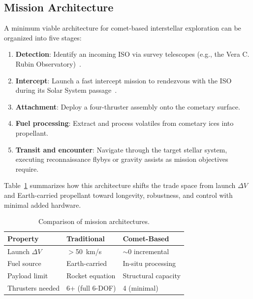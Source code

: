 \documentclass{article}
\begin{document}
\subsection{Mission Architecture}
\label{sec:mission_arch}

A minimum viable architecture for comet-based interstellar exploration can be organized into five stages:

\begin{enumerate}
    \item \textbf{Detection}: Identify an incoming ISO via survey telescopes (e.g., the Vera C. Rubin Observatory)~\cite{engelhardt2017population}.
    
    \item \textbf{Intercept}: Launch a fast intercept mission to rendezvous with the ISO during its Solar System passage~\cite{landau2023iso,loeb2025intercepting}.
    
    \item \textbf{Attachment}: Deploy a four-thruster assembly onto the cometary surface.
    
    \item \textbf{Fuel processing}: Extract and process volatiles from cometary ices into propellant.
    
    \item \textbf{Transit and encounter}: Navigate through the target stellar system, executing reconnaissance flybys or gravity assists as mission objectives require.
\end{enumerate}

Table~\ref{tab:architecture} summarizes how this architecture shifts the trade space from launch $\Delta V$ and Earth-carried propellant toward longevity, robustness, and control with minimal added hardware.

\begin{table}[h!]
\caption{Comparison of mission architectures.}
\label{tab:architecture}
\centering
\small
\setlength{\tabcolsep}{4pt}
\renewcommand{\arraystretch}{1.05}
\begin{tabular}{@{}lll@{}}
\toprule
Property & Traditional & Comet-Based \\
\midrule
Launch $\Delta V$ & $>$50~km/s & $\sim$0 incremental \\
Fuel source & Earth-carried & In-situ processing \\
Payload limit & Rocket equation & Structural capacity \\
Thrusters needed & 6+ (full 6-DOF) & 4 (minimal) \\
\bottomrule
\end{tabular}
\end{table}
\end{document}
